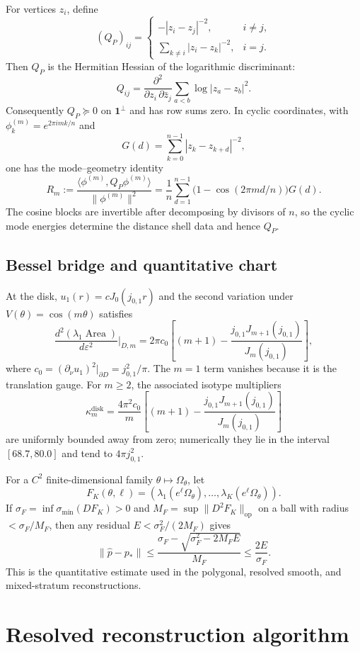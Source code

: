 \documentclass[11pt,reqno]{amsart}
\theoremstyle{plain}
\theoremstyle{definition}
\theoremstyle{remark}
\DeclareMathOperator{\Area}{Area}
\newcommand{\Qop}{Q}
\begin{document}
For vertices $z_i$, define
\[
(\Qop_P)_{ij}=
\begin{cases}
-|z_i-z_j|^{-2},& i\neq j,\\
\sum_{k\neq i}|z_i-z_k|^{-2},& i=j.
\end{cases}
\]
Then $\Qop_P$ is the Hermitian Hessian of the logarithmic discriminant:
\[
\Qop_{ij}=\frac{\partial^2}{\partial z_i\,\partial\bar z_j}
\sum_{a<b}\log |z_a-z_b|^2.
\]
Consequently $\Qop_P\succeq0$ on $\mathbf 1^\perp$ and has row sums zero. In cyclic coordinates, with $\phi^{(m)}_k=e^{2\pi i mk/n}$ and
\[
G(d)=\sum_{k=0}^{n-1}|z_k-z_{k+d}|^{-2},
\]
one has the mode--geometry identity
\[
R_m:=\frac{\langle \phi^{(m)},\Qop_P\phi^{(m)}\rangle}{\|\phi^{(m)}\|^2}
=\frac1n\sum_{d=1}^{n-1}\bigl(1-\cos(2\pi md/n)\bigr)G(d).
\]
The cosine blocks are invertible after decomposing by divisors of $n$, so the cyclic mode energies determine the distance shell data and hence $\Qop_P$.

\subsection{Bessel bridge and quantitative chart}\label{app:ss-bessel-quant}

At the disk, $u_1(r)=cJ_0(j_{0,1}r)$ and the second variation under $V(\theta)=\cos(m\theta)$ satisfies
\[
\frac{d^2(\lambda_1\Area)}{d\varepsilon^2}\bigg|_{D,m}
=2\pi c_0\left[(m+1)-\frac{j_{0,1}J_{m+1}(j_{0,1})}{J_m(j_{0,1})}\right],
\]
where $c_0=(\partial_\nu u_1)^2|_{\partial D}=j_{0,1}^2/\pi$. The $m=1$ term vanishes because it is the translation gauge. For $m\geq2$, the associated isotype multipliers
\[
\kappa_m^{\mathrm{disk}}
=\frac{4\pi^2c_0}{m}
\left[(m+1)-\frac{j_{0,1}J_{m+1}(j_{0,1})}{J_m(j_{0,1})}\right]
\]
are uniformly bounded away from zero; numerically they lie in the interval $[68.7,80.0]$ and tend to $4\pi j_{0,1}^2$.

For a $C^2$ finite-dimensional family $\theta\mapsto\Omega_\theta$, let
\[
F_K(\theta,\ell)=(\lambda_1(e^\ell\Omega_\theta),\dots,\lambda_K(e^\ell\Omega_\theta)).
\]
If $\sigma_F=\inf\sigma_{\min}(DF_K)>0$ and $M_F=\sup\|D^2F_K\|_{\mathrm{op}}$ on a ball with radius $<\sigma_F/M_F$, then any residual $E<\sigma_F^2/(2M_F)$ gives
\[
\|\widehat p-p_*\|
\leq
\frac{\sigma_F-\sqrt{\sigma_F^2-2M_FE}}{M_F}
\leq
\frac{2E}{\sigma_F}.
\]
This is the quantitative estimate used in the polygonal, resolved smooth, and mixed-stratum reconstructions.

\section{Resolved reconstruction algorithm}\label{app:resolved-algorithm}
\end{document}
